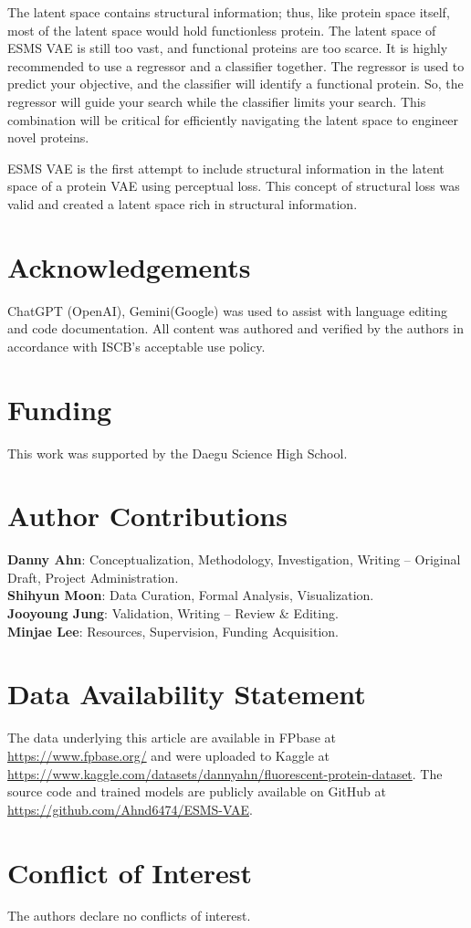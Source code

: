 \documentclass[numsec,webpdf,contemporary,medium]{oup-authoring-template}
\begin{document}
The latent space contains structural information; thus, like protein space itself, most of the latent space would hold functionless protein. The latent space of ESMS VAE is still too vast, and functional proteins are too scarce. It is highly recommended to use a regressor and a classifier together. The regressor is used to predict your objective, and the classifier will identify a functional protein. So, the regressor will guide your search while the classifier limits your search. This combination will be critical for efficiently navigating the latent space to engineer novel proteins.


ESMS VAE is the first attempt to include structural information in the latent space of a protein VAE using perceptual loss. This concept of structural loss was valid and created a latent space rich in structural information.

\section*{Acknowledgements}
ChatGPT (OpenAI), Gemini(Google) was used to assist with language editing and code documentation. All content was authored and verified by the authors in accordance with ISCB’s acceptable use policy.

\section*{Funding}
This work was supported by the Daegu Science High School.

\section*{Author Contributions}

\textbf{Danny Ahn}: Conceptualization, Methodology, Investigation, Writing – Original Draft, Project Administration.\\
\textbf{Shihyun Moon}: Data Curation, Formal Analysis, Visualization.\\
\textbf{Jooyoung Jung}: Validation, Writing – Review \& Editing.\\
\textbf{Minjae Lee}: Resources, Supervision, Funding Acquisition.


\section*{Data Availability Statement}
The data underlying this article are available in FPbase at \href{https://www.fpbase.org/}{https://www.fpbase.org/} and were uploaded to Kaggle at \href{https://www.kaggle.com/datasets/dannyahn/fluorescent-protein-dataset}{https://www.kaggle.com/datasets/dannyahn/fluorescent-protein-dataset}. The source code and trained models are publicly available on GitHub at \href{https://github.com/Ahnd6474/ESMS-VAE}{https://github.com/Ahnd6474/ESMS-VAE}.

\section*{Conflict of Interest}
The authors declare no conflicts of interest.


\end{document}

